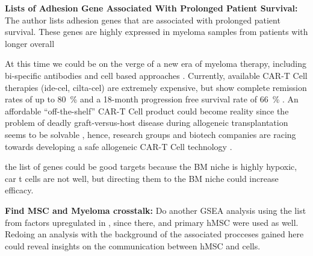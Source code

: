 






\textbf{Lists of Adhesion Gene Associated With Prolonged Patient Survival:}
The author lists adhesion genes that are associated with prolonged patient
survival. These genes are highly expressed in myeloma samples from patients with
longer overall

At this time we could be on the verge of a new era of myeloma therapy,
including bi-specific antibodies and cell based approaches
\cite{moreNovelImmunotherapiesCombinations2023,
      engelhardtFunctionalCureLongterm2024}. Currently, available CAR-T Cell therapies
(ide-cel, cilta-cel) are extremely expensive, but show complete remission rates
of up to \SI{80}{\percent} and a 18-month progression free survival rate of
\SI{66}{\percent} \cite{bobinRecentAdvancesTreatment2022}. An affordable
``off-the-shelf'' CAR-T Cell product could become reality since the problem of
deadly graft-versus-host disease during allogeneic transplantation seems to be
solvable \cite{qasimMolecularRemissionInfant2017}, hence, research groups and
biotech companies are racing towards developing a safe allogeneic CAR-T Cell
technology \cite{depilOfftheshelfAllogeneicCAR2020}.


the list of genes could be good targets because the BM niche is highly hypoxic,
car t cells are not well, but directing them to the BM niche could increase
efficacy.


\textbf{Find MSC and Myeloma crosstalk:}
Do another GSEA analysis using the list from factors upregulated in
\citet{dotterweichContactMyelomaCells2016}, since there, \INA and primary
\ac{hMSC} were used as well. Redoing an analysis with the background of the
associated procceses gained here could reveal insights on the communication
between \ac{hMSC} and \INA cells.



